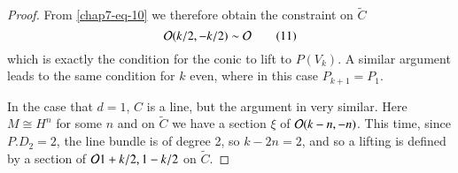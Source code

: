 \begin{proof}
From \eqref{chap7-eq-10} we therefore obtain the constraint on $\tilde{C}$
\begin{equation*}\label{chap7-eq-11}
\mathcal{O}(k/2, -k/2)\sim \mathcal{O}\tag{11}
\end{equation*}
which is exactly the condition for the conic to lift to $P(V_{k})$. A similar argument leads to the same condition for $k$ even, where in this case $P_{k+1} = P_{1}$.

In the case that $d =1$, $C$ is a line, but the argument in  very similar. Here $M\cong H^{n}$ for some $n$ and on $\tilde{C}$ we have a section $\xi$ of $\mathcal{O}(k-n, -n)$. This time, since $P.D_{2} = 2$, the line bundle is of degree 2, so $k-2n =2$, and so a lifting is defined by a section of $\mathcal{O}{1+k/2, 1-k/2}$ on $\tilde{C}$.
\end{proof}

